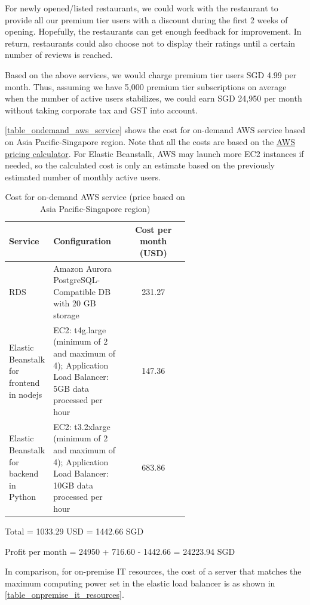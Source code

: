 \documentclass[12pt,a4paper]{article}
\begin{document}
For newly opened/listed restaurants, we could work with the restaurant to provide all our premium tier users with a discount during the first 2 weeks of opening. Hopefully, the restaurants can get enough feedback for improvement. In return, restaurants could also choose not to display their ratings until a certain number of reviews is reached.

Based on the above services, we would charge premium tier users SGD 4.99 per month. Thus, assuming we have 5,000 premium tier subscriptions on average when the number of active users stabilizes, we could earn SGD 24,950 per month without taking corporate tax and GST into account.

\autoref{table_ondemand_aws_service} shows the cost for on-demand AWS service based on Asia Pacific-Singapore region. Note that all the costs are based on the \href{https://calculator.aws/#}{AWS pricing calculator}. For Elastic Beanstalk, AWS may launch more EC2 instances if needed, so the calculated cost is only an estimate based on the previously estimated number of monthly active users.

\begin{table}[H]
	\centering
	\begin{tabular}{p{0.2\linewidth}|p{0.4\linewidth}|c}	%
	\hline \hline
	Service
	    & Configuration
	    & Cost per month (USD)\\
		\hline
	RDS
		& Amazon Aurora PostgreSQL-Compatible DB with 20 GB storage
		& 231.27 \\
	Elastic Beanstalk for frontend in nodejs
		& EC2: t4g.large (minimum of 2 and maximum of 4); Application Load Balancer: 5GB data processed per hour
		& 147.36 \\
	Elastic Beanstalk for backend in Python
	    & EC2: t3.2xlarge (minimum of 2 and maximum of 4); Application Load Balancer: 10GB data processed per hour
    	& 683.86 \\
	\hline \hline
	\end{tabular}
	\caption{Cost for on-demand AWS service (price based on Asia Pacific-Singapore region)}
	\label{table_ondemand_aws_service}
\end{table}

Total = 1033.29 USD = 1442.66 SGD

Profit per month = 24950 + 716.60 - 1442.66 = 24223.94 SGD

In comparison, for on-premise IT resources, the cost of a server that matches the maximum computing power set in the elastic load balancer is as shown in \autoref{table_onpremise_it_resources}.
\end{document}
